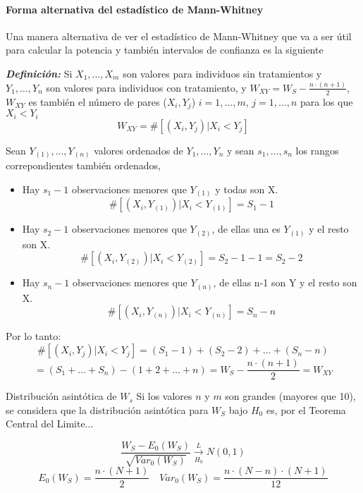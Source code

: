 \paragraph{Forma alternativa del estadístico de Mann-Whitney}

Una manera alternativa de ver el estadístico de Mann-Whitney que va a ser útil para calcular la potencia y también intervalos de confianza es la siguiente

\vspace*{2mm}

\textit{\textbf{Definición: }} Si $X_1,\dots,X_m$ son valores para individuos sin tratamientos y $Y_1,\dots,Y_n$ son valores para individuos con tratamiento,
y $W_{XY}=W_S-\frac{n \cdot (n+1)}{2}$, $W_{XY}$ es también el número de pares ($X_i,Y_j$) $i=1,\dots,m$, $j=1,\dots,n$ para los que $X_i < Y_i$
\[
    W_{XY}= \# [(X_i,Y_j) | X_i <Y_j]
\]

\begin{proofs}
    Sean $Y_{(1)}, \dots, Y_{(n)}$ valores ordenados de $Y_1,\dots,Y_n$ y sean $s_1,\dots,s_n$ los rangos correpondientes también ordenados,
    \begin{itemize}
        \item Hay $s_1-1$ observaciones menores que $Y_{(1)}$ y todas son X.
        \[
            \# [(X_i,Y_{(1)}) | X_i <Y_{(1)}]=S_1-1
        \]
        \item Hay $s_2-1$ observaciones menores que $Y_{(2)}$, de ellas una es $Y_{(1)}$ y el resto son X.
        \[
            \# [(X_i,Y_{(2)}) | X_i <Y_{(2)}]=S_2-1-1=S_2-2
        \]
        \item Hay $s_n-1$ observaciones menores que $Y_{(n)}$, de ellas n-1 son Y y el resto son X.
        \[
            \# [(X_i,Y_{(n)}) | X_i <Y_{(n)}]=S_n-n
        \]
    \end{itemize} 
    Por lo tanto:
    \[
        \# [(X_i,Y_j) | X_i <Y_j]=(S_1-1)+(S_2-2)+ \dots +(S_n-n)
    \]
    \[    
        =(S_1+\dots+S_n)-(1+2+\dots+n)=W_S-\frac{n \cdot (n+1)}{2}=W_{XY}
    \]
\end{proofs}

\vspace{5mm}

Distribución asintótica de $W_s$
Si los valores $n$ y $m$ son grandes (mayores que 10), se considera que la distribución asintótica para $W_S$ bajo $H_0$ es, por el Teorema Central del Limite...

\[
    \frac{W_S-E_0(W_S)}{\sqrt{Var_{0}(W_S)}} \xrightarrow[H_0]{L} N(0,1)
\]
\[
    E_0(W_S)=\frac{n \cdot (N+1)}{2} \quad Var_0(W_S)=\frac{n \cdot (N-n) \cdot (N+1)}{12}
\]